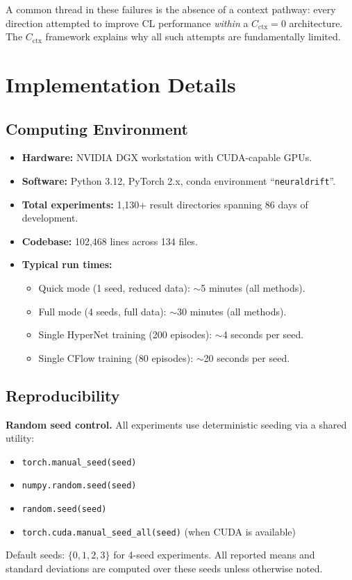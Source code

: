 \documentclass{article}
\begin{document}
A common thread in these failures is the absence of a context pathway: every direction attempted to improve CL performance \emph{within} a $C_\mathrm{ctx} = 0$ architecture. The $C_\mathrm{ctx}$ framework explains why all such attempts are fundamentally limited.


\section{Implementation Details}
\label{app:implementation}

\subsection{Computing Environment}
\label{app:computing}

\begin{itemize}
    \item \textbf{Hardware:} NVIDIA DGX workstation with CUDA-capable GPUs.
    \item \textbf{Software:} Python 3.12, PyTorch 2.x, conda environment ``\texttt{neuraldrift}''.
    \item \textbf{Total experiments:} 1,130+ result directories spanning 86 days of development.
    \item \textbf{Codebase:} 102,468 lines across 134 files.
    \item \textbf{Typical run times:}
    \begin{itemize}
        \item Quick mode (1 seed, reduced data): $\sim$5 minutes (all methods).
        \item Full mode (4 seeds, full data): $\sim$30 minutes (all methods).
        \item Single HyperNet training (200 episodes): $\sim$4 seconds per seed.
        \item Single CFlow training (80 episodes): $\sim$20 seconds per seed.
    \end{itemize}
\end{itemize}


\subsection{Reproducibility}
\label{app:reproducibility}

\textbf{Random seed control.}
All experiments use deterministic seeding via a shared utility:
\begin{itemize}
    \item \texttt{torch.manual\_seed(seed)}
    \item \texttt{numpy.random.seed(seed)}
    \item \texttt{random.seed(seed)}
    \item \texttt{torch.cuda.manual\_seed\_all(seed)} (when CUDA is available)
\end{itemize}
Default seeds: $\{0, 1, 2, 3\}$ for 4-seed experiments. All reported means and standard deviations are computed over these seeds unless otherwise noted.
\end{document}
